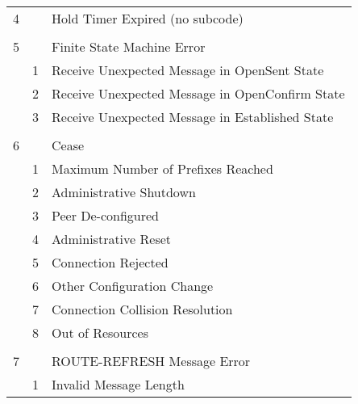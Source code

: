 \documentclass[documentation]{subfiles}
\begin{document}
\begin{longtable}{ccl}
    4 &    & Hold Timer Expired (no subcode)\\\\
    5 &    & Finite State Machine Error\\
      &  1 & \qquad Receive Unexpected Message in OpenSent State\\
      &  2 & \qquad Receive Unexpected Message in OpenConfirm State\\
      &  3 & \qquad Receive Unexpected Message in Established State\\\\
    6 &    & Cease\\
      &  1 & \qquad Maximum Number of Prefixes Reached\\
      &  2 & \qquad Administrative Shutdown\\
      &  3 & \qquad Peer De-configured\\
      &  4 & \qquad Administrative Reset\\
      &  5 & \qquad Connection Rejected\\
      &  6 & \qquad Other Configuration Change\\
      &  7 & \qquad Connection Collision Resolution\\
      &  8 & \qquad Out of Resources\\\\
    7 &    & ROUTE-REFRESH Message Error\\
      &  1 & \qquad Invalid Message Length\\
    \bottomrule
\end{longtable}
\end{document}

